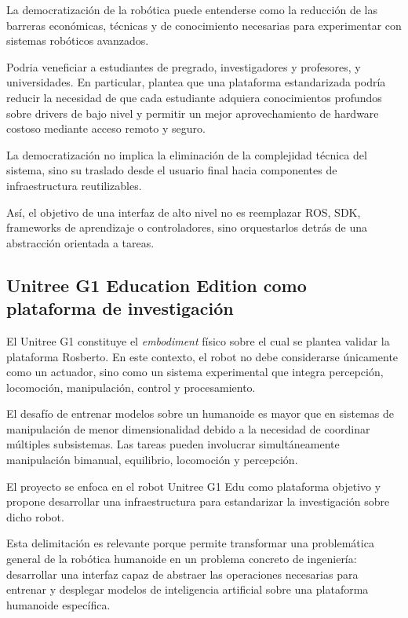 \documentclass[stu,12pt,floatsintext]{apa7}
\begin{document}
La democratización de la robótica puede entenderse como la reducción de las barreras económicas, técnicas y de conocimiento necesarias para experimentar con sistemas robóticos avanzados.

Podria veneficiar a estudiantes de pregrado, investigadores y profesores, y universidades. En particular, plantea que una plataforma estandarizada podría reducir la necesidad de que cada estudiante adquiera conocimientos profundos sobre drivers de bajo nivel y permitir un mejor aprovechamiento de hardware costoso mediante acceso remoto y seguro.

La democratización no implica la eliminación de la complejidad técnica del sistema, sino su traslado desde el usuario final hacia componentes de infraestructura reutilizables.

Así, el objetivo de una interfaz de alto nivel no es reemplazar ROS, SDK, frameworks de aprendizaje o controladores, sino orquestarlos detrás de una abstracción orientada a tareas.

\subsection{Unitree G1 Education Edition como plataforma de investigación}

El Unitree G1 constituye el \textit{embodiment} físico sobre el cual se plantea validar la plataforma Rosberto. En este contexto, el robot no debe considerarse únicamente como un actuador, sino como un sistema experimental que integra percepción, locomoción, manipulación, control y procesamiento.

El desafío de entrenar modelos sobre un humanoide es mayor que en sistemas de manipulación de menor dimensionalidad debido a la necesidad de coordinar múltiples subsistemas. Las tareas pueden involucrar simultáneamente manipulación bimanual, equilibrio, locomoción y percepción.

El proyecto se enfoca en el robot Unitree G1 Edu como plataforma objetivo y propone desarrollar una infraestructura para estandarizar la investigación sobre dicho robot.

Esta delimitación es relevante porque permite transformar una problemática general de la robótica humanoide en un problema concreto de ingeniería: desarrollar una interfaz capaz de abstraer las operaciones necesarias para entrenar y desplegar modelos de inteligencia artificial sobre una plataforma humanoide específica.
\end{document}
